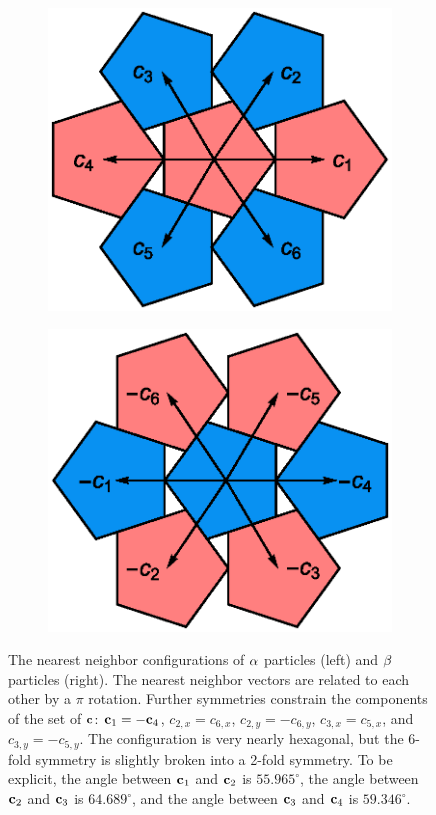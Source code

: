 \documentclass[12pt]{article}
\begin{document}
\begin{figure}
\centering
\begin{subfigure}{0.4\textwidth}
\includegraphics[scale=0.6]{alphabonds.eps}
\end{subfigure}
\begin{subfigure}{0.4\textwidth}
\includegraphics[scale=0.6]{betabonds.eps}
\end{subfigure}
\caption{The nearest neighbor configurations of $\alpha$ particles (left) and $\beta$ 
particles (right). The nearest neighbor vectors are related to each other by a 
$\pi$ rotation. Further symmetries constrain the components of the set of $\mathbf{c}$: $\mathbf{c}_1 = -\mathbf{c}_4$, $c_{2,x} = c_{6,x}$, $c_{2,y}=-c_{6,y}$, $c_{3,x} = 
c_{5,x}$, and $c_{3,y} = -c_{5,y}$. The configuration is very nearly hexagonal, 
but the 6-fold symmetry is slightly broken into a 2-fold symmetry. To be 
explicit, the angle between $\mathbf{c}_1$ and $\mathbf{c}_2$ is $55.965^\circ$, the angle 
between $\mathbf{c}_2$ and $\mathbf{c}_3$ is $64.689^\circ$, and the angle between $\mathbf{c}_3$ and $\mathbf{c}_4$ is $59.346^\circ$.}
\label{pentagonnn}
\end{figure}
\end{document}
